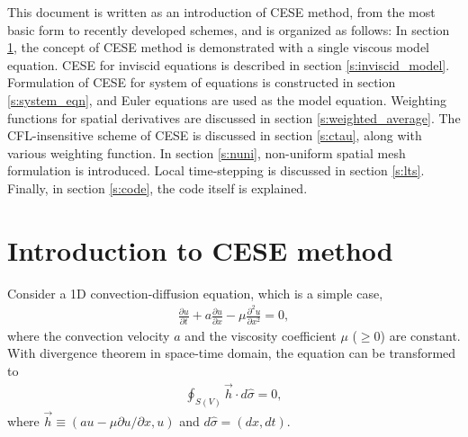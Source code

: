\documentclass[11pt,dvips]{article}
\numberwithin{equation}{section}
\begin{document}
This document is written as an introduction of CESE method, from the most basic
form to recently developed schemes, and is organized as follows: In section
\ref{s:cese_intro}, the concept of CESE method is demonstrated with a single
viscous model equation.  CESE for inviscid equations is described in section
\ref{s:inviscid_model}.  Formulation of CESE for system of equations is
constructed in section \ref{s:system_eqn}, and Euler equations are used as the
model equation.  Weighting functions for spatial derivatives are discussed in
section \ref{s:weighted_average}.  The CFL-insensitive scheme of CESE is
discussed in section \ref{s:ctau}, along with various weighting function.  In
section \ref{s:nuni}, non-uniform spatial mesh formulation is introduced.
Local time-stepping is discussed in section \ref{s:lts}.  Finally, in section
\ref{s:code}, the code itself is explained.

\section{Introduction to CESE method}
\label{s:cese_intro}

Consider a 1D convection-diffusion equation, which is a simple case,
\begin{align}
    \frac{\partial u}{\partial t} + a\frac{\partial u}{\partial x}
  - \mu\frac{\partial^2u}{\partial x^2} = 0, \label{e:conv_diff_govern}
\end{align}
where the convection velocity $a$ and the viscosity coefficient $\mu$ ($\ge0$)
are constant.  With divergence theorem in space-time domain, the equation can
be transformed to
\begin{align}
  \oint_{S(V)}\vec{h}\cdot d\hat{\sigma}=0, \label{e:conservation}
\end{align}
where $\vec{h}\equiv(au-\mu\partial u/\partial x,u)$ and $d\hat{\sigma}=(dx,
dt)$.
\end{document}
